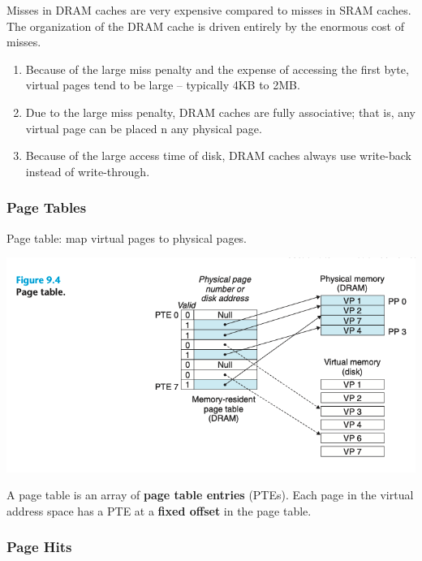 \documentclass[11pt]{article}
\begin{document}
Misses in DRAM caches are very expensive compared to misses in SRAM caches. The organization of the DRAM cache is driven entirely by the enormous cost of misses.\\

\begin{enumerate}
\item Because of the large miss penalty and the expense of accessing the first byte, virtual pages tend to be large -- typically 4KB to 2MB.\\
\item Due to the large miss penalty, DRAM caches are fully associative; that is, any virtual page can be placed n any physical page.\\
\item Because of the large access time of disk, DRAM caches always use write-back instead of write-through.\\
\end{enumerate}



\subsubsection{Page Tables}
\label{sec:org5c6b098}
Page table: map virtual pages to physical pages.\\

\begin{center}
\includegraphics[width=.9\linewidth]{pics/figure9.4-page-table.png}
\end{center}

A page table is an array of \textbf{page table entries} (PTEs). Each page in the virtual address space has a PTE at a \textbf{fixed offset} in the page table.\\

\subsubsection{Page Hits}
\label{sec:org7da5ff8}
\end{document}
